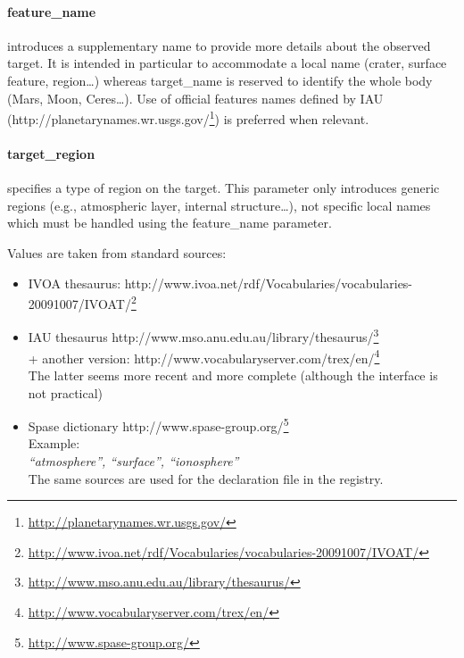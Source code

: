 \documentclass[11pt,a4paper]{ivoa}
\begin{document}
\paragraph{feature\_name}

introduces a supplementary name to provide more details about the observed target. It is intended in particular to accommodate a local name (crater, surface feature, region…) whereas target\_name is reserved to identify the whole body (Mars, Moon, Ceres…). Use of official features names defined by IAU (http://planetarynames.wr.usgs.gov/\footnote{\url{http://planetarynames.wr.usgs.gov/}}) is preferred when relevant.

\paragraph{target\_region}

specifies a type of region on the target. This parameter only introduces generic regions  (e.g., atmospheric layer, internal structure…), not specific local names which must be handled using the feature\_name parameter.

Values are taken from standard sources:

\begin{itemize}

\item IVOA thesaurus: http://www.ivoa.net/rdf/Vocabularies/vocabularies-20091007/IVOAT/\footnote{\url{http://www.ivoa.net/rdf/Vocabularies/vocabularies-20091007/IVOAT/}}

\item IAU thesaurus http://www.mso.anu.edu.au/library/thesaurus/\footnote{\url{http://www.mso.anu.edu.au/library/thesaurus/}}\\+ another version: http://www.vocabularyserver.com/trex/en/\footnote{\url{http://www.vocabularyserver.com/trex/en/}}\\The latter seems more recent and more complete (although the interface is not practical)

\item Spase dictionary http://www.spase-group.org/\footnote{\url{http://www.spase-group.org/}}\\Example: \\\emph{``atmosphere'', ``surface'', ``ionosphere''}\\The same sources are used for the declaration file in the registry.

\end{itemize}
\end{document}
